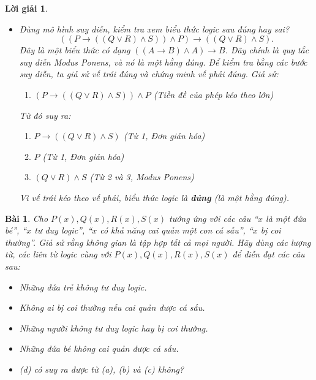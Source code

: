 \documentclass[11pt, oneside, a4paper]{article}
\newtheorem{bt}{Bài}[section]
\newtheorem{loigiai}{Lời giải}[bt]
\begin{document}
\begin{loigiai}
\begin{itemize}
        \item[b)] Dùng mô hình suy diễn, kiểm tra xem biểu thức logic sau đúng hay sai?
        $$((P \rightarrow ((Q \lor R) \land S)) \land P) \rightarrow ((Q \lor R) \land S).$$
        Đây là một biểu thức có dạng $( (A \rightarrow B) \land A ) \rightarrow B$. Đây chính là quy tắc suy diễn Modus Ponens, và nó là một hằng đúng.
        Để kiểm tra bằng các bước suy diễn, ta giả sử vế trái đúng và chứng minh vế phải đúng.
        Giả sử:
        \begin{enumerate}
            \item $(P \rightarrow ((Q \lor R) \land S)) \land P$ (Tiền đề của phép kéo theo lớn)
        \end{enumerate}
        Từ đó suy ra:
        \begin{enumerate}
            \item[2.] $P \rightarrow ((Q \lor R) \land S)$ (Từ 1, Đơn giản hóa)
            \item[3.] $P$ (Từ 1, Đơn giản hóa)
            \item[4.] $(Q \lor R) \land S$ (Từ 2 và 3, Modus Ponens)
        \end{enumerate}
        Vì vế trái kéo theo vế phải, biểu thức logic là \textbf{đúng} (là một hằng đúng).
    \end{itemize}
    \end{loigiai}
    
    \begin{bt}
    Cho $P(x), Q(x), R(x), S(x)$ tướng ứng với các câu ``$x$ là một đứa bé'', ``$x$ tư duy logic'', ``$x$ có khả năng cai quản một con cá sấu'', ``$x$ bị coi thường''. Giả sử rằng không gian là tập hợp tất cả mọi người. Hãy dùng các lượng từ, các liên từ logic cùng với $P(x), Q(x), R(x), S(x)$ để diễn đạt các câu sau:
    \begin{itemize}
    \item[a)] Những đứa trẻ không tư duy logic.
    \item[b)] Không ai bị coi thường nếu cai quản được cá sấu.
    \item[c)] Những người không tư duy logic hay bị coi thường.
    \item[d)] Những đứa bé không cai quản được cá sấu.
    \item[e)] (d) có suy ra được từ (a), (b) và (c) không?
    \end{itemize}
    \end{bt}
    
\end{document}
